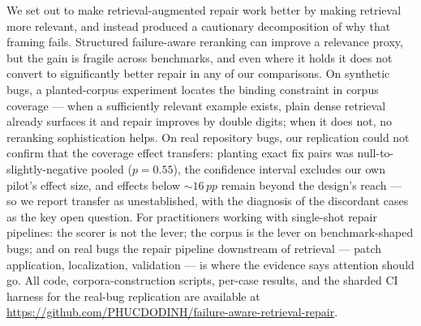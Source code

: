 \documentclass[10pt,conference,a4paper]{IEEEtran}
\newcommand{\pp}{\,pp}
\begin{document}
We set out to make retrieval-augmented repair work better by making
retrieval more relevant, and instead produced a cautionary decomposition of
why that framing fails. Structured failure-aware reranking can improve a
relevance proxy, but the gain is fragile across benchmarks, and even where
it holds it does not convert to significantly better repair in any of our
comparisons. On synthetic bugs, a planted-corpus experiment locates the
binding constraint in corpus coverage --- when a sufficiently relevant
example exists, plain dense retrieval already surfaces it and repair
improves by double digits; when it does not, no reranking sophistication
helps. On real repository bugs, our replication could not confirm that the
coverage effect transfers: planting exact fix pairs was
null-to-slightly-negative pooled ($p{=}0.55$), the confidence interval
excludes our own pilot's effect size, and effects below ${\sim}16\pp$
remain beyond the design's reach --- so we report transfer as
unestablished, with the diagnosis of the discordant cases as the key open
question. For practitioners working with single-shot repair pipelines: the
scorer is not the lever; the corpus is the lever on benchmark-shaped bugs;
and on real bugs the repair pipeline downstream of retrieval --- patch
application, localization, validation --- is where the evidence says
attention should go. All code, corpora-construction scripts, per-case
results, and the sharded CI harness for the real-bug replication are
available at
\url{https://github.com/PHUCDODINH/failure-aware-retrieval-repair}.



\end{document}
